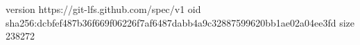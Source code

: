 version https://git-lfs.github.com/spec/v1
oid sha256:dcbfef487b36f669f06226f7af6487dabb4a9c32887599620bb1ae02a04ee3fd
size 238272
